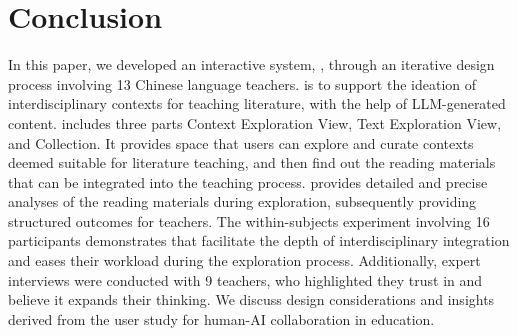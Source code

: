 \section{Conclusion}
In this paper, we developed an interactive system, \name{}, through an iterative design process involving 13 Chinese language teachers.
\name{} is to support the ideation of interdisciplinary contexts for teaching literature, with the help of LLM-generated content. \name{} includes three parts \ie Context Exploration View, Text Exploration View, and Collection.
It provides space that users can explore and curate contexts deemed suitable for literature teaching, and then find out the reading materials that can be integrated into the teaching process. 
\name{} provides detailed and precise analyses of the reading materials during exploration, subsequently providing structured outcomes for teachers. The within-subjects experiment involving 16 participants demonstrates that \name{} facilitate the depth of interdisciplinary integration and eases their workload during the exploration process.
Additionally, expert interviews were conducted with 9 teachers, who highlighted they trust in \name{} and believe it expands their thinking. We discuss design considerations and insights derived from the user study for human-AI collaboration in education.